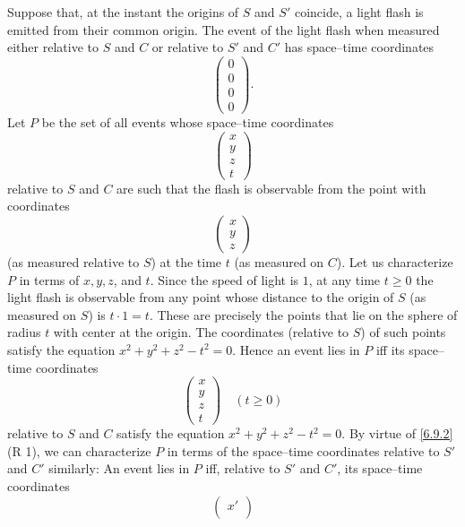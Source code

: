\begin{thm}\label{6.40}
  Suppose that, at the instant the origins of \(S\) and \(S'\) coincide, a light flash is emitted from their common origin.
  The event of the light flash when measured either relative to \(S\) and \(C\) or relative to \(S'\) and \(C'\) has space--time
  coordinates
  \[
    \begin{pmatrix}
      0 \\
      0 \\
      0 \\
      0
    \end{pmatrix}.
  \]
  Let \(P\) be the set of all events whose space--time coordinates
  \[
    \begin{pmatrix}
      x \\
      y \\
      z \\
      t
    \end{pmatrix}
  \]
  relative to \(S\) and \(C\) are such that the flash is observable from the point with coordinates
  \[
    \begin{pmatrix}
      x \\
      y \\
      z
    \end{pmatrix}
  \]
  (as measured relative to \(S\)) at the time \(t\) (as measured on \(C\)).
  Let us characterize \(P\) in terms of \(x, y, z\), and \(t\).
  Since the speed of light is \(1\), at any time \(t \geq 0\) the light flash is observable from any point whose distance to the origin of \(S\) (as measured on \(S\)) is \(t \cdot 1 = t\).
  These are precisely the points that lie on the sphere of radius \(t\) with center at the origin.
  The coordinates (relative to \(S\)) of such points satisfy the equation \(x^2 + y^2 + z^2 - t^2 = 0\).
  Hence an event lies in \(P\) iff its space--time coordinates
  \[
    \begin{pmatrix}
      x \\
      y \\
      z \\
      t
    \end{pmatrix} \quad (t \geq 0)
  \]
  relative to \(S\) and \(C\) satisfy the equation \(x^2 + y^2 + z^2 - t^2 = 0\).
  By virtue of \cref{6.9.2} (R 1), we can characterize \(P\) in terms of the space--time coordinates relative to \(S'\) and \(C'\) similarly:
  An event lies in \(P\) iff, relative to \(S'\) and \(C'\), its space--time coordinates
  \[
    \begin{pmatrix}
      x' \\

\end{pmatrix}\]
\end{thm}
